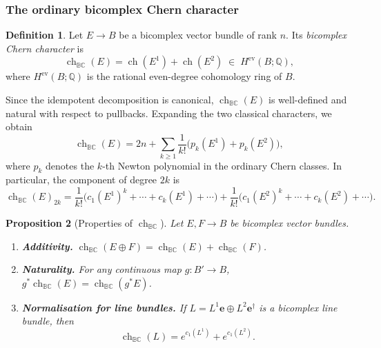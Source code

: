 \documentclass[11pt]{amsart}
\newcommand{\BC}{\mathbb{BC}}       %
\newcommand{\e}{\mathbf{e}}          %
\newcommand{\ed}{\mathbf{e}^\dagger} %
\newtheorem{prop}{Proposition}[section]   %
\theoremstyle{definition}
\newtheorem{defn}[prop]{Definition}       %
\begin{document}
\subsubsection*{The ordinary bicomplex Chern character}

\begin{defn}\label{def:ch-ordinary}
Let $E\to B$ be a bicomplex vector bundle of rank $n$.  Its \emph{bicomplex Chern character} is
\begin{equation*}
\operatorname{ch}_{\BC}(E)
=\operatorname{ch}(E^1)+\operatorname{ch}(E^2)
\;\in\;H^{\mathrm{ev}}(B;\mathbb Q),
\end{equation*}
where $H^{\mathrm{ev}}(B;\mathbb Q)$ is the rational even-degree cohomology ring of $B$.
\end{defn}

Since the idempotent decomposition is canonical, $\operatorname{ch}_{\BC}(E)$ is well-defined and natural with respect to pullbacks.  Expanding the two classical characters, we obtain
\begin{equation*}
\operatorname{ch}_{\BC}(E)
=2n+\sum_{k\ge 1}\frac{1}{k!}\bigl(p_{k}(E^1)+p_{k}(E^2)\bigr),
\end{equation*}
where $p_{k}$ denotes the $k$-th Newton polynomial in the ordinary Chern classes.  In particular, the component of degree $2k$ is
\begin{equation*}
\operatorname{ch}_{\BC}(E)_{2k}
=\frac{1}{k!}\bigl(c_{1}(E^1)^{k}+\cdots+c_{k}(E^1)+\cdots\bigr)
+\frac{1}{k!}\bigl(c_{1}(E^2)^{k}+\cdots+c_{k}(E^2)+\cdots\bigr).
\end{equation*}

\begin{prop}[Properties of $\operatorname{ch}_{\BC}$]\label{prop:ch-properties}
Let $E,F\to B$ be bicomplex vector bundles.
\begin{enumerate}
\item\label{it:chern-add} \textbf{Additivity.} $\operatorname{ch}_{\BC}(E\oplus F)=\operatorname{ch}_{\BC}(E)+\operatorname{ch}_{\BC}(F)$.
\item\label{it:chern-nat} \textbf{Naturality.} For any continuous map $g:B'\to B$,
$g^{*}\operatorname{ch}_{\BC}(E)=\operatorname{ch}_{\BC}(g^{*}E)$.
\item\label{it:chern-norm} \textbf{Normalisation for line bundles.} If $L=L^{1}\e\oplus L^{2}\ed$ is a bicomplex line bundle, then
\begin{equation*}
\operatorname{ch}_{\BC}(L)=e^{c_{1}(L^{1})}+e^{c_{1}(L^{2})}.
\end{equation*}
\end{enumerate}
\end{prop}
\end{document}
